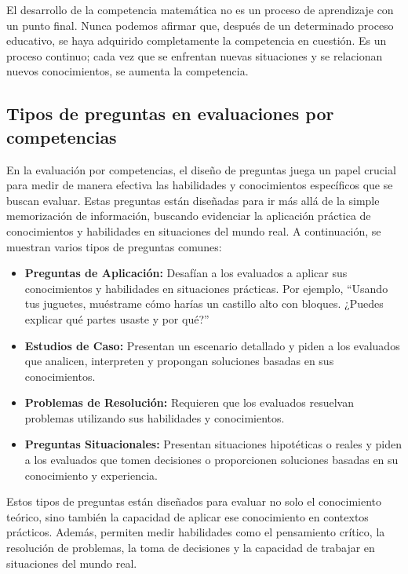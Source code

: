 El desarrollo de la competencia matemática no es un proceso de aprendizaje con un punto final. Nunca podemos afirmar que, después de un determinado proceso educativo, se haya adquirido completamente la competencia en cuestión. Es un proceso continuo; cada vez que se enfrentan nuevas situaciones y se relacionan nuevos conocimientos, se aumenta la competencia.

\subsection{Tipos de preguntas en evaluaciones por competencias}

En la evaluación por competencias, el diseño de preguntas juega un papel crucial para medir de manera efectiva las habilidades y conocimientos específicos que se buscan evaluar. Estas preguntas están diseñadas para ir más allá de la simple memorización de información, buscando evidenciar la aplicación práctica de conocimientos y habilidades en situaciones del mundo real. A continuación, se muestran varios tipos de preguntas comunes:

\begin{itemize}[leftmargin=*]
  \item \textbf{Preguntas de Aplicación:} Desafían a los evaluados a aplicar sus conocimientos y habilidades en situaciones prácticas. Por ejemplo, ``Usando tus juguetes, muéstrame cómo harías un castillo alto con bloques. ¿Puedes explicar qué partes usaste y por qué?''
  \item \textbf{Estudios de Caso:} Presentan un escenario detallado y piden a los evaluados que analicen, interpreten y propongan soluciones basadas en sus conocimientos.
  \item \textbf{Problemas de Resolución:} Requieren que los evaluados resuelvan problemas utilizando sus habilidades y conocimientos.
  \item \textbf{Preguntas Situacionales:} Presentan situaciones hipotéticas o reales y piden a los evaluados que tomen decisiones o proporcionen soluciones basadas en su conocimiento y experiencia.
\end{itemize}

Estos tipos de preguntas están diseñados para evaluar no solo el conocimiento teórico, sino también la capacidad de aplicar ese conocimiento en contextos prácticos. Además, permiten medir habilidades como el pensamiento crítico, la resolución de problemas, la toma de decisiones y la capacidad de trabajar en situaciones del mundo real.

